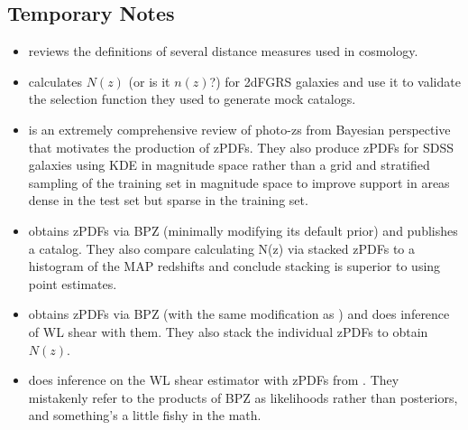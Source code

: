 \documentclass[preprint]{aastex}
\begin{document}
\subsection*{Temporary Notes}

\begin{itemize}
\item \citet{hog99} reviews the definitions of several distance measures used in cosmology.
\item \citet{nor01} calculates $N(z)$ (or is it $n(z)$?) for 2dFGRS galaxies and use it to validate the selection function they used to generate mock catalogs.
\item \citet{bud08} is an extremely comprehensive review of photo-zs from Bayesian perspective that motivates the production of zPDFs. They also produce zPDFs for SDSS galaxies using KDE in magnitude space rather than a grid and stratified sampling of the training set in magnitude space to improve support in areas dense in the test set but sparse in the training set.
\item \citet{hil11} obtains zPDFs via BPZ (minimally modifying its default prior) and publishes a catalog.  They also compare calculating N(z) via stacked zPDFs to a histogram of the MAP redshifts and conclude stacking is superior to using point estimates.
\item \citet{kel12} obtains zPDFs via BPZ (with the same modification as \citet{hil11}) and does inference of WL shear with them.  They also stack the individual zPDFs to obtain $N(z)$.
\item \citet{app12} does inference on the WL shear estimator with zPDFs from \citet{kel12}.  They mistakenly refer to the products of BPZ as likelihoods rather than posteriors, and something's a little fishy in the math.

\end{itemize}
\end{document}
